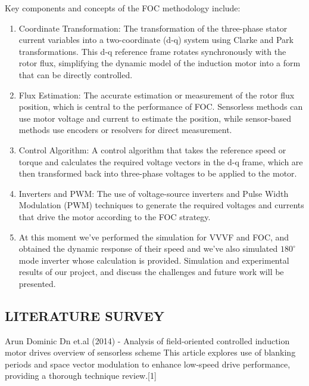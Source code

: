 Key components and concepts of the FOC methodology include:
\begin{enumerate}
	\item  Coordinate Transformation: The transformation of the three-phase stator current variables into a two-coordinate (d-q) system using Clarke and Park transformations. This d-q reference frame rotates synchronously with the rotor flux, simplifying the dynamic model of the induction motor into a form that can be directly controlled.

	\item  Flux Estimation: The accurate estimation or measurement of the rotor flux position, which is central to the performance of FOC. Sensorless methods can use motor voltage and current to estimate the position, while sensor-based methods use encoders or resolvers for direct measurement.

	\item Control Algorithm: A control algorithm that takes the reference speed or torque and calculates the required voltage vectors in the d-q frame, which are then transformed back into three-phase voltages to be applied to the motor.

	\item Inverters and PWM: The use of voltage-source inverters and Pulse Width Modulation (PWM) techniques to generate the required voltages and currents that drive the motor according to the FOC strategy.

	\item At this moment we've performed the simulation for VVVF and FOC, and obtained the dynamic response of their speed and we've also simulated  $180^\circ$ mode inverter whose calculation is provided. Simulation and experimental results of our project, and discuss the challenges and future work will be presented.
\end{enumerate}
\subsection{LITERATURE SURVEY}



\hspace{0.2in}Arun Dominic Dn et.al (2014) - Analysis of field-oriented controlled induction motor drives overview of sensorless scheme This article  explores use of blanking periods and space vector modulation to enhance low-speed drive performance, providing a thorough technique review.[1]

\vspace{10mm} %

